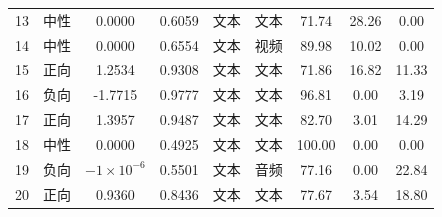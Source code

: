 \begin{longtable}{@{\extracolsep{\fill}}ccccccccc@{}}
13 & 中性 & 0.0000 & 0.6059 & 文本 & 文本 & 71.74 & 28.26 & 0.00 \\
14 & 中性 & 0.0000 & 0.6554 & 文本 & 视频 & 89.98 & 10.02 & 0.00 \\
15 & 正向 & 1.2534 & 0.9308 & 文本 & 文本 & 71.86 & 16.82 & 11.33 \\
16 & 负向 & -1.7715 & 0.9777 & 文本 & 文本 & 96.81 & 0.00 & 3.19 \\
17 & 正向 & 1.3957 & 0.9487 & 文本 & 文本 & 82.70 & 3.01 & 14.29 \\
18 & 中性 & 0.0000 & 0.4925 & 文本 & 文本 & 100.00 & 0.00 & 0.00 \\
19 & 负向 & $-1\times10^{-6}$ & 0.5501 & 文本 & 音频 & 77.16 & 0.00 & 22.84 \\
20 & 正向 & 0.9360 & 0.8436 & 文本 & 文本 & 77.67 & 3.54 & 18.80 \\
\end{longtable}
\endgroup
